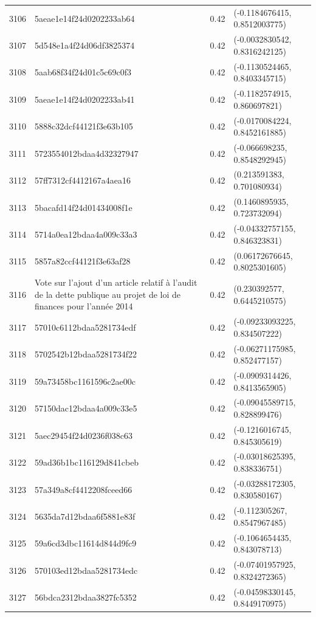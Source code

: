 \begin{table}[ht]
\begin{tabular}{rlrl}
  3106 & 5aeae1e14f24d0202233ab64 & 0.42 & (-0.1184676415, 0.8512003775) \\ 
  3107 & 5d548e1a4f24d06df3825374 & 0.42 & (-0.0032830542, 0.8316242125) \\ 
  3108 & 5aab68f34f24d01c5c69c0f3 & 0.42 & (-0.1130524465, 0.8403345715) \\ 
  3109 & 5aeae1e14f24d0202233ab41 & 0.42 & (-0.1182574915, 0.860697821) \\ 
  3110 & 5888c32dcf44121f3e63b105 & 0.42 & (-0.0170084224, 0.8452161885) \\ 
  3111 & 5723554012bdaa4d32327947 & 0.42 & (-0.066698235, 0.8548292945) \\ 
  3112 & 57ff7312cf4412167a4aea16 & 0.42 & (0.213591383, 0.701080934) \\ 
  3113 & 5bacafd14f24d01434008f1e & 0.42 & (0.1460895935, 0.723732094) \\ 
  3114 & 5714a0ea12bdaa4a009c33a3 & 0.42 & (-0.04332757155, 0.846323831) \\ 
  3115 & 5857a82ccf44121f3e63af28 & 0.42 & (0.06172676645, 0.8025301605) \\ 
  3116 & Vote sur l'ajout d'un article relatif à l'audit de la dette publique au projet de loi de finances pour l'année 2014 & 0.42 & (0.230392577, 0.6445210575) \\ 
  3117 & 57010c6112bdaa5281734edf & 0.42 & (-0.09233093225, 0.834507222) \\ 
  3118 & 5702542b12bdaa5281734f22 & 0.42 & (-0.06271175985, 0.852477157) \\ 
  3119 & 59a73458bc1161596c2ae00c & 0.42 & (-0.0909314426, 0.8413565905) \\ 
  3120 & 57150dac12bdaa4a009c33e5 & 0.42 & (-0.09045589715, 0.828899476) \\ 
  3121 & 5aec29454f24d0236f038c63 & 0.42 & (-0.1216016745, 0.845305619) \\ 
  3122 & 59ad36b1bc116129d841cbeb & 0.42 & (-0.03018625395, 0.838336751) \\ 
  3123 & 57a349a8cf4412208fceed66 & 0.42 & (-0.03288172305, 0.830580167) \\ 
  3124 & 5635da7d12bdaa6f5881e83f & 0.42 & (-0.112305267, 0.8547967485) \\ 
  3125 & 59a6cd3dbc11614d844d9fc9 & 0.42 & (-0.1064654435, 0.843078713) \\ 
  3126 & 570103ed12bdaa5281734edc & 0.42 & (-0.07401957925, 0.8324272365) \\ 
  3127 & 56bdca2312bdaa3827fc5352 & 0.42 & (-0.04598330145, 0.8449170975) \\ 

\end{tabular}
\end{table}
